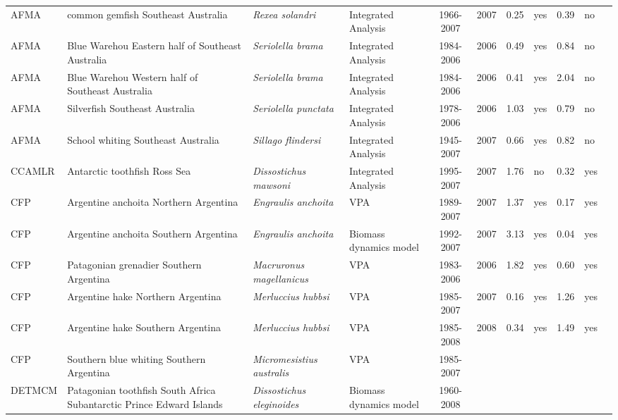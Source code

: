 \begin{longtable}{p{1.8cm}p{3.5cm}p{3.5cm}p{3cm}cccp{0.9cm}cp{0.9cm}c}
  AFMA & common gemfish Southeast Australia & \textit{Rexea solandri} & Integrated Analysis & 1966-2007 & 2007 & 0.25 & yes & 0.39 & no & \cite{GEMFISHSE.pdf} \\ 
  AFMA & Blue Warehou Eastern half of Southeast Australia & \textit{Seriolella brama} & Integrated Analysis & 1984-2006 & 2006 & 0.49 & yes & 0.84 & no & \cite{WAREHOUSE.pdf} \\ 
  AFMA & Blue Warehou Western half of Southeast Australia & \textit{Seriolella brama} & Integrated Analysis & 1984-2006 & 2006 & 0.41 & yes & 2.04 & no & \cite{WAREHOUSE.pdf} \\ 
  AFMA & Silverfish Southeast Australia & \textit{Seriolella punctata} & Integrated Analysis & 1978-2006 & 2006 & 1.03 & yes & 0.79 & no & \cite{SILVERFISHSE.pdf} \\ 
  AFMA & School whiting Southeast Australia & \textit{Sillago flindersi} & Integrated Analysis & 1945-2007 & 2007 & 0.66 & yes & 0.82 & no & \cite{SWHITSE.pdf} \\ 
  CCAMLR & Antarctic toothfish Ross Sea & \textit{Dissostichus mawsoni} & Integrated Analysis & 1995-2007 & 2007 & 1.76 & no & 0.32 & yes & \cite{ATOOTHFISHRS.pdf} \\ 
  CFP & Argentine anchoita Northern Argentina & \textit{Engraulis anchoita} & VPA & 1989-2007 & 2007 & 1.37 & yes & 0.17 & yes & \cite{Hansen-ANCHOVY-N-2007.pdf} \\ 
  CFP & Argentine anchoita Southern Argentina & \textit{Engraulis anchoita} & Biomass dynamics model & 1992-2007 & 2007 & 3.13 & yes & 0.04 & yes & \cite{Hansen-ANCHOVY-S-2007.pdf} \\ 
  CFP & Patagonian grenadier Southern Argentina & \textit{Macruronus magellanicus} & VPA & 1983-2006 & 2006 & 1.82 & yes & 0.60 & yes & \cite{Giussi-hoki-2007.pdf} \\ 
  CFP & Argentine hake Northern Argentina & \textit{Merluccius hubbsi} & VPA & 1985-2007 & 2007 & 0.16 & yes & 1.26 & yes & \cite{Irusta-hake-N-2007.pdf} \\ 
  CFP & Argentine hake Southern Argentina & \textit{Merluccius hubbsi} & VPA & 1985-2008 & 2008 & 0.34 & yes & 1.49 & yes & \cite{Renzi-hake-S-2009.pdf} \\ 
  CFP &  Southern blue whiting Southern Argentina & \textit{Micromesistius australis} & VPA & 1985-2007 &  &  &  &  &  & \cite{Giussi-polaca-2007.pdf} \\ 
  DETMCM & Patagonian toothfish South Africa Subantarctic Prince Edward Islands & \textit{Dissostichus eleginoides} & Biomass dynamics model & 1960-2008 &  &  &  &  &  & \cite{Branch-SA-Toothfish-2007.pdf} \\ 

\end{longtable}
